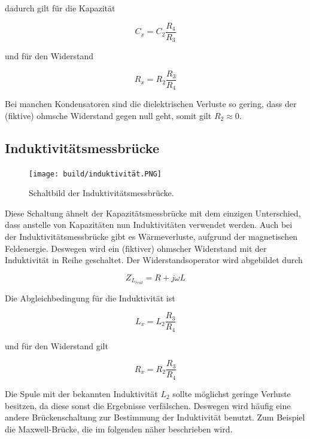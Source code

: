 dadurch gilt für die Kapazität

\begin{equation}
    C_x = C_2 \frac{R_4}{R_3}
    \label{eqn:kapazität_kap}
\end{equation}

und für den Widerstand

\begin{equation}
    R_x = R_2 \frac{R_3}{R_4}
    \label{eqn:widerstand_kap}
\end{equation}

Bei manchen Kondensatoren sind die dielektrischen Verluste so gering, dass der (fiktive) ohmsche Widerstand gegen null geht, somit gilt $R_2 \approx 0$.


\subsection{Induktivitätsmessbrücke}
\label{subsec:induktivität}

\begin{figure}[H]
    \centering
    \texttt{[image: build/induktivität.PNG]}
    \caption{Schaltbild der Induktivitätsmessbrücke.\cite[221]{V302}}
    \label{fig:induktivität}
\end{figure}

Diese Schaltung ähnelt der Kapazitätsmessbrücke mit dem einzigen Unterschied, dass anstelle von Kapazitäten nun Induktivitäten verwendet werden.
Auch bei der Induktivitätsmessbrücke gibt es Wärmeverluste, aufgrund der magnetischen Feldenergie.
Deswegen wird ein (fiktiver) ohmscher Widerstand mit der Induktivität in Reihe geschaltet.
Der Widerstandsoperator wird abgebildet durch

\begin{equation}
    Z_{L_{real}} = R + j\omega L
    \label{eqn:widerop_ind}
\end{equation}

Die Abgleichbedingung für die Induktivität ist

\begin{equation}
    L_x = L_2 \frac{R_3}{R_4}
    \label{eqn:induktivität_ind}
\end{equation}

und für den Widerstand gilt

\begin{equation}
    R_x = R_2 \frac{R_3}{R_4}
    \label{eqn:widerstand_ind}
\end{equation}

Die Spule mit der bekannten Induktivität $L_2$ sollte möglichst geringe Verluste besitzen, da diese sonst die Ergebnisse verfälschen. 
Deswegen wird häufig eine andere Brückenschaltung zur Bestimmung der Induktivität benutzt.
Zum Beispiel die Maxwell-Brücke, die im folgenden näher beschrieben wird.

